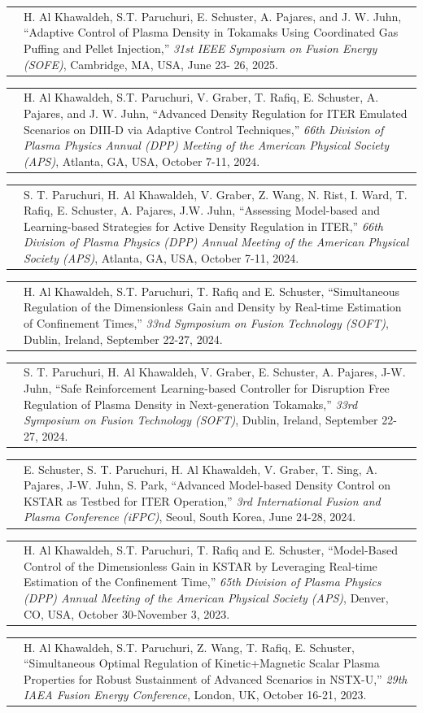 \documentclass[11pt,letterpaper]{article}
\makeatletter
\newcommand{\CVItem}[2]{%
  \begin{tabularx}{\textwidth}{@{}p{0.83in}@{\hspace{0.15in}}X@{}}
    \raggedleft{#1} & #2\\[3pt]
  \end{tabularx}
}
\makeatother
\begin{document}
\CVItem{[7]}{H. Al Khawaldeh, S.T. Paruchuri, E. Schuster, A. Pajares, and J. W. Juhn, ``Adaptive Control of Plasma Density in Tokamaks Using Coordinated Gas Puffing and Pellet Injection,'' \textit{31st IEEE Symposium on Fusion Energy (SOFE)}, Cambridge, MA, USA, June 23- 26, 2025.}

\CVItem{[8]}{H. Al Khawaldeh, S.T. Paruchuri, V. Graber, T. Rafiq, E. Schuster, A. Pajares, and J. W. Juhn, ``Advanced Density Regulation for ITER Emulated Scenarios on DIII-D via Adaptive Control Techniques,'' \textit{66th Division of Plasma Physics Annual (DPP) Meeting of the American Physical Society (APS)}, Atlanta, GA, USA, October 7-11, 2024.}

\CVItem{[9]}{S. T. Paruchuri, H. Al Khawaldeh, V. Graber, Z. Wang, N. Rist, I. Ward, T. Rafiq, E. Schuster, A. Pajares, J.W. Juhn, ``Assessing Model-based and Learning-based Strategies for Active Density Regulation in ITER,'' \textit{66th Division of Plasma Physics (DPP) Annual Meeting of the American Physical Society (APS)}, Atlanta, GA, USA, October 7-11, 2024.}

\CVItem{[10]}{H. Al Khawaldeh, S.T. Paruchuri, T. Rafiq and E. Schuster, ``Simultaneous Regulation of the Dimensionless Gain and Density by Real-time Estimation of Confinement Times,'' \textit{33nd Symposium on Fusion Technology (SOFT)}, Dublin, Ireland, September 22-27, 2024.}

\CVItem{[11]}{S. T. Paruchuri, H. Al Khawaldeh, V. Graber, E. Schuster, A. Pajares, J-W. Juhn, ``Safe Reinforcement Learning-based Controller for Disruption Free Regulation of Plasma Density in Next-generation Tokamaks,'' \textit{33rd Symposium on Fusion Technology (SOFT)}, Dublin, Ireland, September 22-27, 2024. }

\CVItem{[12]}{E. Schuster, S. T. Paruchuri, H. Al Khawaldeh, V. Graber, T. Sing, A. Pajares, J-W. Juhn, S. Park, ``Advanced Model-based Density Control on KSTAR as Testbed for ITER Operation,'' \textit{3rd International Fusion and Plasma Conference (iFPC)}, Seoul, South Korea, June 24-28, 2024. }

\CVItem{[13]}{H. Al Khawaldeh, S.T. Paruchuri, T. Rafiq and E. Schuster, ``Model-Based Control of the Dimensionless Gain in KSTAR by Leveraging Real-time Estimation of the Confinement Time,'' \textit{65th Division of Plasma Physics (DPP) Annual Meeting of the American Physical Society (APS)}, Denver, CO, USA, October 30-November 3, 2023. }

\CVItem{[14]}{H. Al Khawaldeh, S.T. Paruchuri, Z. Wang, T. Rafiq, E. Schuster, ``Simultaneous Optimal Regulation of Kinetic+Magnetic Scalar Plasma Properties for Robust Sustainment of Advanced Scenarios in NSTX-U,'' \textit{29th IAEA Fusion Energy Conference}, London, UK, October 16-21, 2023. }
\end{document}
